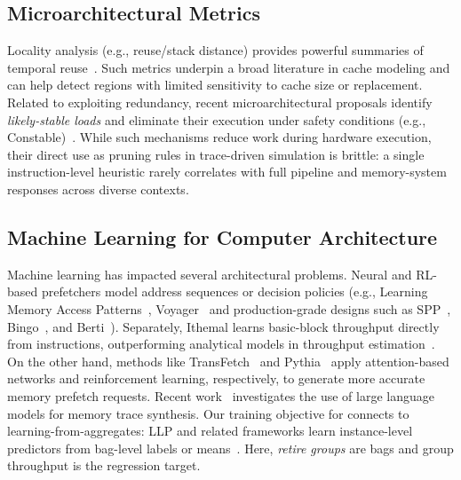 \subsection{Microarchitectural Metrics}
Locality analysis (e.g., reuse/stack distance) provides powerful summaries of temporal reuse~\cite{mattson1970,benkruskal1975}. Such metrics underpin a broad literature in cache modeling and can help detect regions with limited sensitivity to cache size or replacement. Related to exploiting redundancy, recent microarchitectural proposals identify \emph{likely-stable loads} and eliminate their execution under safety conditions (e.g., Constable)~\cite{constable}. While such mechanisms reduce work during hardware execution, their direct use as pruning rules in trace-driven simulation is brittle: a single instruction-level heuristic rarely correlates with full pipeline and memory-system responses across diverse contexts. 
\subsection{Machine Learning for Computer Architecture}
Machine learning has impacted several architectural problems. Neural and RL-based prefetchers model address sequences or decision policies (e.g., Learning Memory Access Patterns~\cite{hashemi2018learning}, Voyager~\cite{voyager-asplos21} and production-grade designs such as SPP~\cite{spp-micro16}, Bingo~\cite{bingo-hpca19}, and Berti~\cite{berti-micro22}). Separately, Ithemal learns basic-block throughput directly from instructions, outperforming analytical models in throughput estimation~\cite{pmlr-v97-mendis19a}. 
On the other hand, methods like TransFetch~\cite{transfetch} and Pythia~\cite{pythia} apply attention-based networks and reinforcement learning, respectively, to generate more accurate memory prefetch requests. Recent work~\cite{mine} investigates the use of large language models for memory trace synthesis.
Our training objective for \pts connects to learning-from-aggregates: LLP and related frameworks learn instance-level predictors from bag-level labels or means~\cite{yu2014-llp,scott2020-llp,law2018-agg,zhang2020-agg}. Here, \emph{retire groups} are bags and group throughput is the regression target.
 
